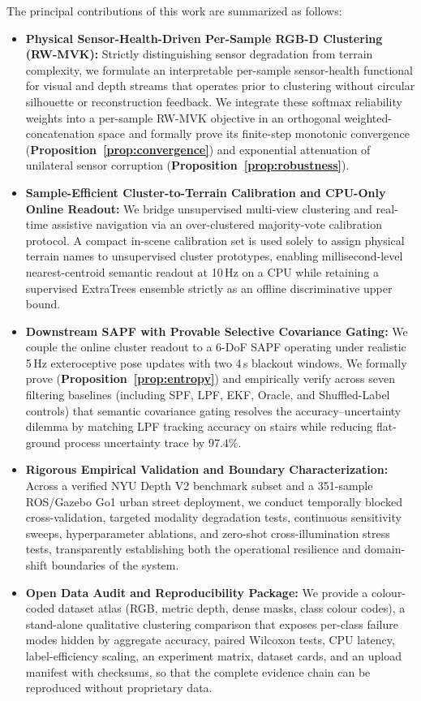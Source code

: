 \documentclass[11pt, a4paper]{article}
\begin{document}
The principal contributions of this work are summarized as follows:
\begin{itemize}
    \item \textbf{Physical Sensor-Health-Driven Per-Sample RGB-D Clustering (RW-MVK):} Strictly distinguishing sensor degradation from terrain complexity, we formulate an interpretable per-sample sensor-health functional for visual and depth streams that operates prior to clustering without circular silhouette or reconstruction feedback. We integrate these softmax reliability weights into a per-sample RW-MVK objective in an orthogonal weighted-concatenation space and formally prove its finite-step monotonic convergence (\textbf{Proposition~\ref{prop:convergence}}) and exponential attenuation of unilateral sensor corruption (\textbf{Proposition~\ref{prop:robustness}}).
    \item \textbf{Sample-Efficient Cluster-to-Terrain Calibration and CPU-Only Online Readout:} We bridge unsupervised multi-view clustering and real-time assistive navigation via an over-clustered majority-vote calibration protocol. A compact in-scene calibration set is used solely to assign physical terrain names to unsupervised cluster prototypes, enabling millisecond-level nearest-centroid semantic readout at 10\,Hz on a CPU while retaining a supervised ExtraTrees ensemble strictly as an offline discriminative upper bound.
    \item \textbf{Downstream SAPF with Provable Selective Covariance Gating:} We couple the online cluster readout to a 6-DoF SAPF operating under realistic 5\,Hz exteroceptive pose updates with two 4\,s blackout windows. We formally prove (\textbf{Proposition~\ref{prop:entropy}}) and empirically verify across seven filtering baselines (including SPF, LPF, EKF, Oracle, and Shuffled-Label controls) that semantic covariance gating resolves the accuracy--uncertainty dilemma by matching LPF tracking accuracy on stairs while reducing flat-ground process uncertainty trace by $97.4\%$.
    \item \textbf{Rigorous Empirical Validation and Boundary Characterization:} Across a verified NYU Depth V2 benchmark subset and a 351-sample ROS/Gazebo Go1 urban street deployment, we conduct temporally blocked cross-validation, targeted modality degradation tests, continuous sensitivity sweeps, hyperparameter ablations, and zero-shot cross-illumination stress tests, transparently establishing both the operational resilience and domain-shift boundaries of the system.
    \item \textbf{Open Data Audit and Reproducibility Package:} We provide a colour-coded dataset atlas (RGB, metric depth, dense masks, class colour codes), a stand-alone qualitative clustering comparison that exposes per-class failure modes hidden by aggregate accuracy, paired Wilcoxon tests, CPU latency, label-efficiency scaling, an experiment matrix, dataset cards, and an upload manifest with checksums, so that the complete evidence chain can be reproduced without proprietary data.
\end{itemize}
\end{document}
